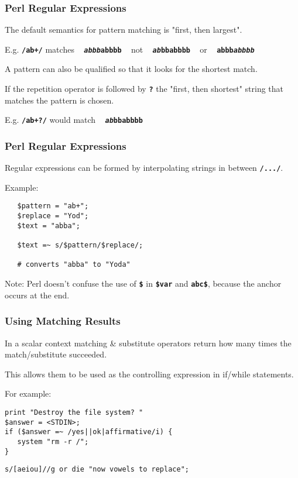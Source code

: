 \begin{frame}
\frametitle{Perl Regular Expressions}
The default semantics for pattern matching is "first, then largest".

E.g. \textbf{\tt{/ab+/}} matches ~ \textbf{\tt{{\em{abbb}}abbbb}} ~
	not ~ \textbf{\tt{{\em{ab}}bbabbbb}} ~ or
	~ \textbf{\tt{abbb{\em{abbbb}}}}

A pattern can also be qualified so that it looks for the shortest match.

If the repetition operator is followed by \textbf{\tt{?}} the "first, then shortest"
string that matches the pattern is chosen.

E.g. \textbf{\tt{/ab+?/}} would match ~ \textbf{\tt{{\em{ab}}bbabbbb}}
\end{frame}

\begin{frame}
\frametitle{Perl Regular Expressions}
Regular expressions can be formed by interpolating strings in between \textbf{\tt{/.../}}.

Example:
\begin{verbatim}
   $pattern = "ab+";
   $replace = "Yod";
   $text = "abba";

   $text =~ s/$pattern/$replace/;

   # converts "abba" to "Yoda"
\end{verbatim}

{\small 
Note: Perl doesn't confuse the use of \textbf{\tt{\$}} in \textbf{\tt{\$var}} and \textbf{\tt{abc\$}},
because the anchor occurs at the end.
}
\end{frame}

\begin{frame}
\frametitle{Using Matching Results}
In a scalar context matching \& substitute operators
return how many times the match/substitute succeeded.

This allows them to be used as the controlling expression
in if/while statements.

For example:

\begin{verbatim}
print "Destroy the file system? "
$answer = <STDIN>;
if ($answer =~ /yes||ok|affirmative/i) {
   system "rm -r /";
}
\end{verbatim}


\begin{verbatim}
s/[aeiou]//g or die "now vowels to replace";
\end{verbatim}

\end{frame}

